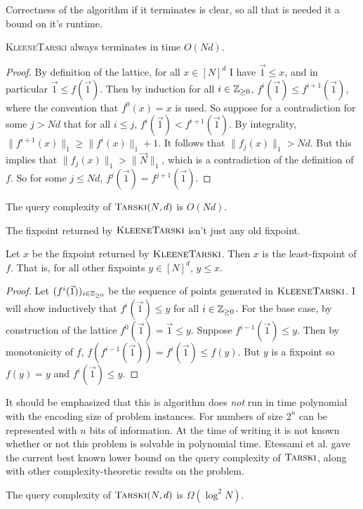 Correctness of the algorithm if it terminates is clear, so all that is needed it a bound on it's runtime.
\begin{lemma}
  \textsc{KleeneTarski} always terminates in time $O(Nd)$.
\end{lemma}
\begin{proof}
  By definition of the lattice, for all $x \in [N]^d$ I have $\vec{1} \leq x$, and in particular
  $\vec{1} \leq f(\vec{1})$. Then by induction for all $i \in \mathbb{Z}_{\geq 0}$, $f^i(\vec{1}) \leq f^{i + 1}(\vec{1})$, where the convention
  that $f^0(x) = x$ is used.
  So suppose for a contradiction for some $j > Nd$ that for all $i \leq j$, $f^i(\vec{1}) < f^{i+1}(\vec{1})$. 
  By integrality, $\|f^{i+1}(x)\|_1 \geq \|f^i(x)\|_1 + 1$. It follows that $\|f_j(x)\|_1 > Nd$. But this implies that
  $\|f_j(x)\|_1 > \|\vec{N}\|_1$, which is a contradiction of the definition of $f$. So for some $j \leq Nd$, $f^j(\vec{1}) = f^{j+1}(\vec{1})$.
\end{proof}
\begin{theorem}
  The query complexity of $\textsc{Tarski}(N,d)$ is $O(Nd)$.
\end{theorem}
The fixpoint returned by $\textsc{KleeneTarski}$ isn't just any old fixpoint.
\begin{lemma}\label{kleeneLfp}
  Let $x$ be the fixpoint returned by $\textsc{KleeneTarski}$. Then $x$ is the least-fixpoint
  of $f$. That is, for all other fixpoints $y \in [N]^d$, $y \leq x$.
\end{lemma}
\begin{proof}
  Let $(f^i(\vec{1}))_{i \in \mathbb{Z}_{\geq 0}}$ be the sequence of points generated in $\textsc{KleeneTarski}$.
  I will show inductively that $f^i(\vec{1}) \leq y$ for all $i \in \mathbb{Z}_{\geq 0}$. For the base case,
  by construction of the lattice $f^0(\vec{1}) = \vec{1} \leq y$. Suppose $f^{i-1}(\vec{1}) \leq y$.
  Then by monotonicity of $f$, $f(f^{i-1}(\vec{1})) = f^i(\vec{1}) \leq f(y)$. But $y$ is a fixpoint
  so $f(y) = y$ and $f^i(\vec{1}) \leq y$.
\end{proof}
It should be emphasized that this is algorithm does \emph{not} run in time polynomial with the encoding size
of problem instances. For numbers of size $2^n$ can be represented with $n$ bits of information. 
At the time of writing
it is not known whether or not this problem is solvable in polynomial time.
Etessami et al. gave the current best known lower bound on the query complexity of $\textsc{Tarski}$, along with other complexity-theoretic results
on the problem.
\begin{theorem}\label{lowerBoundThm}
  The query complexity of $\textsc{Tarski}(N, d)$ is $\Omega(\log^2N)$.
\end{theorem}
